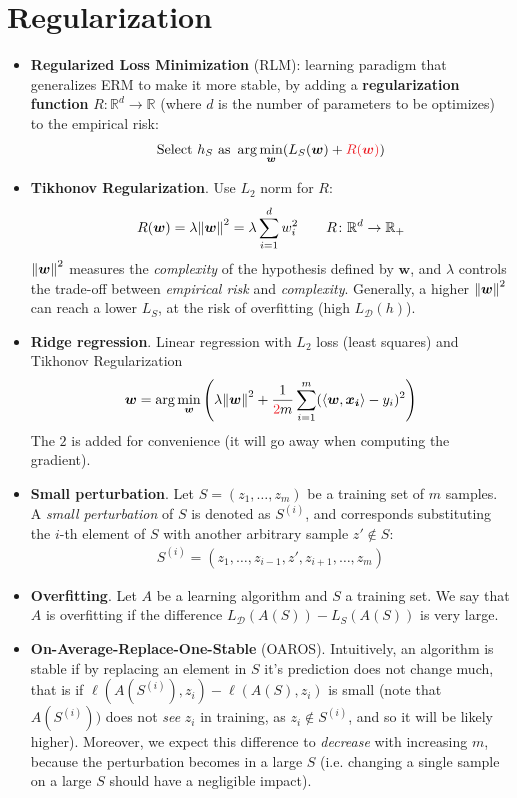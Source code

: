\documentclass[../template.tex]{subfiles}
\begin{document}
\section{Regularization}
\begin{itemize}
    \item \textbf{Regularized Loss Minimization} (RLM): learning paradigm that generalizes ERM to make it more stable, by adding a \textbf{regularization function} $R \colon \mathbb{R}^d \to \mathbb{R}$ (where $d$ is the number of parameters to be optimizes) to the empirical risk:
    \begin{align*}
        \text{Select $h_S$ as } \arg\min_{\bm{w}} (L_S(\bm{w})+ \textcolor{Red}{R(\bm{w})})
    \end{align*}  
    \item \textbf{Tikhonov Regularization}. Use $L_2$ norm for $R$:
    \begin{align*}
        R(\bm{w}) = \lambda\norm{\bm{w}}^2 = \lambda\sum_{i=1}^d w_i^2 \qquad R\colon \mathbb{R}^d \to \mathbb{R}_+
    \end{align*} 
    $\norm{\bm{w}}^2$ measures the \textit{complexity} of the hypothesis defined by $\bm{w}$, and $\lambda$ controls the trade-off between \textit{empirical risk} and \textit{complexity}. Generally, a higher $\norm{\bm{w}}^2$ can reach a lower $L_S$, at the risk of overfitting (high $L_{\mathcal{D}}(h)$).
    \item \textbf{Ridge regression}. Linear regression with $L_2$ loss (least squares) and Tikhonov Regularization
    \begin{align*}
        \bm{w} = \arg\min_{\bm{w}} \left(\lambda\norm{\bm{w}}^2 + \frac{1}{\textcolor{Red}{2}m} \sum_{i=1}^m (\langle \bm{w}, \bm{x_i} \rangle - y_i)^2  \right)
    \end{align*}  
    The $2$ is added for convenience (it will go away when computing the gradient).
    \item \textbf{Small perturbation}. Let $S = (z_1, \dots, z_m)$ be a training set of $m$ samples. A \textit{small perturbation} of $S$ is denoted as $S^{(i)}$, and corresponds substituting the $i$-th element of $S$ with another arbitrary sample $z' \not\in S$:
    \begin{align*}
        S^{(i)} = (z_1, \dots, z_{i-1}, z', z_{i+1}, \dots, z_m)
    \end{align*}  
    \item \textbf{Overfitting}. Let $A$ be a learning algorithm and $S$ a training set. We say that $A$ is overfitting if the difference $L_{\mathcal{D}}(A(S)) - L_S(A(S))$ is very large.
    \item \textbf{On-Average-Replace-One-Stable} (OAROS). Intuitively, an algorithm is stable if by replacing an element in $S$ it's prediction does not change much, that is if $\ell(A(S^{(i)}), z_i) - \ell(A(S), z_i)$ is small (note that $A(S^{(i)}))$ does not \textit{see} $z_i$ in training, as $z_i \not\in S^{(i)}$, and so it will be likely higher). Moreover, we expect this difference to \textit{decrease} with increasing $m$, because the perturbation becomes  in a large $S$ (i.e. changing a single sample on a large $S$ should have a negligible impact).
    

\end{itemize}
\end{document}
